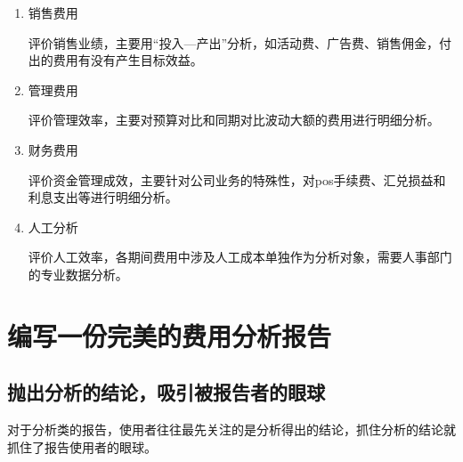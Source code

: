 \documentclass[linespread=1.5,a4paper]{ctexart}
\begin{document}
\begin{enumerate}
	\item 销售费用
	
	评价销售业绩，主要用“投入—产出”分析，如活动费、广告费、销售佣金，付出的费用有没有产生目标效益。
	\item 管理费用
	
	评价管理效率，主要对预算对比和同期对比波动大额的费用进行明细分析。
	
	\item 财务费用
	
	评价资金管理成效，主要针对公司业务的特殊性，对pos手续费、汇兑损益和利息支出等进行明细分析。

	\item 人工分析
	
	评价人工效率，各期间费用中涉及人工成本单独作为分析对象，需要人事部门的专业数据分析。
%		
%		
%		
%		
%		
%	

\end{enumerate}

\section{编写一份完美的费用分析报告}

\subsection{抛出分析的结论，吸引被报告者的眼球}
	
对于分析类的报告，使用者往往最先关注的是分析得出的结论，抓住分析的结论就抓住了报告使用者的眼球。
\end{document}
